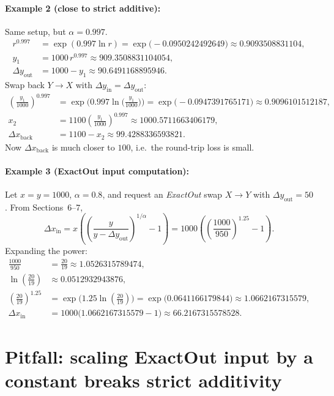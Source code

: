 \documentclass[11pt]{article}
\theoremstyle{definition}
\theoremstyle{remark}
\newcommand{\dx}{\Delta x}
\newcommand{\dy}{\Delta y}
\begin{document}
\paragraph{Example 2 (close to strict additive):} Same setup, but \(\alpha=0.997\).
\begin{align*}
r^{0.997} &= \exp(0.997\ln r)=\exp\!\big(-0.0950242492649\big)\approx 0.9093508831104,\\
y_1 &= 1000\,r^{0.997} \approx 909.3508831104054,\\
\dy_{\mathrm{out}} &= 1000-y_1 \approx 90.6491168895946.
\end{align*}
Swap back \(Y\to X\) with \(\dy_{\mathrm{in}}=\dy_{\mathrm{out}}\):
\begin{align*}
\left(\frac{y_1}{1000}\right)^{0.997}
&= \exp\!\Big(0.997\ln\!\big(\tfrac{y_1}{1000}\big)\Big)
= \exp\!\big(-0.0947391765171\big)\approx 0.9096101512187,\\
x_2 &= 1100\left(\frac{y_1}{1000}\right)^{0.997} \approx 1000.5711663406179,\\
\dx_{\mathrm{back}} &= 1100-x_2 \approx 99.4288336593821.
\end{align*}
Now \(\dx_{\mathrm{back}}\) is much closer to \(100\), i.e.\ the round-trip loss is small.

\paragraph{Example 3 (ExactOut input computation):} Let \(x=y=1000\), \(\alpha=0.8\), and request an \emph{ExactOut} swap \(X\to Y\) with \(\dy_{\mathrm{out}}=50\).
From Sections~6--7,
\[
\dx_{\mathrm{in}} = x\left(\left(\frac{y}{y-\dy_{\mathrm{out}}}\right)^{1/\alpha}-1\right)
= 1000\left(\left(\frac{1000}{950}\right)^{1.25}-1\right).
\]
Expanding the power:
\begin{align*}
\frac{1000}{950} &= \frac{20}{19} \approx 1.0526315789474,\\
\ln\!\left(\tfrac{20}{19}\right) &\approx 0.0512932943876,\\
\left(\tfrac{20}{19}\right)^{1.25} &= \exp\!\Big(1.25\ln\!\left(\tfrac{20}{19}\right)\Big)
= \exp\!\big(0.0641166179844\big)\approx 1.0662167315579,\\
\dx_{\mathrm{in}} &= 1000\big(1.0662167315579-1\big)\approx 66.2167315578528.
\end{align*}
\section{Pitfall: scaling ExactOut input by a constant breaks strict additivity}\label{sec:pitfall}
\end{document}

